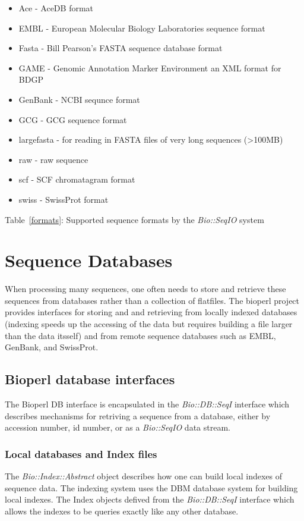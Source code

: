 \documentclass{article}
\begin{document}
\begin{itemize}
\item Ace     - AceDB format
\item EMBL    - European Molecular Biology Laboratories sequence format
\item Fasta   - Bill Pearson's FASTA sequence database format
\item GAME    - Genomic Annotation Marker Environment an XML format
for BDGP
\item GenBank - NCBI sequnce format
\item GCG     - GCG sequence format
\item largefasta - for reading in FASTA files of very long sequences
(>100MB)
\item raw     - raw sequence
\item scf     - SCF chromatagram format
\item swiss   - SwissProt format
\end{itemize}
\label{formats}
\centerline{Table~\ref{formats}: Supported sequence formats by the \emph{Bio::SeqIO} system}

\section{Sequence Databases}

When processing many sequences, one often needs to store and retrieve
these sequences from databases rather than a collection of flatfiles.
The bioperl project provides interfaces for storing and and retrieving
from locally indexed databases (indexing speeds up the accessing of
the data but requires building a file larger than the data itsself)
and from remote sequence databases such as EMBL, GenBank, and SwissProt.

\subsection{Bioperl database interfaces}
The Bioperl DB interface is encapsulated in the \emph{Bio::DB::SeqI}
interface which describes mechanisms for retriving a sequence from a
database, either by accession number, id number, or as a
\emph{Bio::SeqIO} data stream.

\subsubsection{Local databases and Index files}
The \emph{Bio::Index::Abstract} object describes how one can build
local indexes of sequence data.  The indexing system uses the DBM
database system for building local indexes.  The Index objects defived
from the \emph{Bio::DB::SeqI} interface which allows the indexes to be
queries exactly like any other database.
\end{document}
